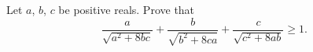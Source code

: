 Let $a$, $b$, $c$ be positive reals. Prove that
\[ \frac{a}{\sqrt{a^2+8bc}} + \frac{b}{\sqrt{b^2+8ca}} + \frac{c}{\sqrt{c^2+8ab}} \ge 1. \]